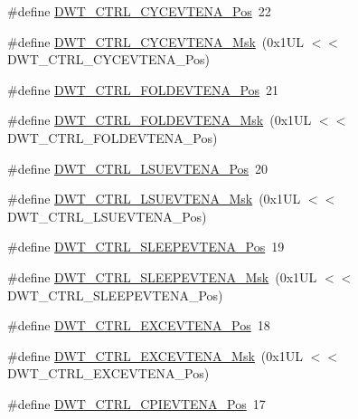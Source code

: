 \begin{DoxyCompactItemize}
\item 
\#define \hyperlink{group__CMSIS__DWT_ga0cb0640aaeb18a626d7823570d5c3cb6}{D\+W\+T\+\_\+\+C\+T\+R\+L\+\_\+\+C\+Y\+C\+E\+V\+T\+E\+N\+A\+\_\+\+Pos}~22
\item 
\#define \hyperlink{group__CMSIS__DWT_ga40554bd81460e39abf08810f45fac1a2}{D\+W\+T\+\_\+\+C\+T\+R\+L\+\_\+\+C\+Y\+C\+E\+V\+T\+E\+N\+A\+\_\+\+Msk}~(0x1\+U\+L $<$$<$ D\+W\+T\+\_\+\+C\+T\+R\+L\+\_\+\+C\+Y\+C\+E\+V\+T\+E\+N\+A\+\_\+\+Pos)
\item 
\#define \hyperlink{group__CMSIS__DWT_ga5602b0707f446ce78d88ff2a3a82bfff}{D\+W\+T\+\_\+\+C\+T\+R\+L\+\_\+\+F\+O\+L\+D\+E\+V\+T\+E\+N\+A\+\_\+\+Pos}~21
\item 
\#define \hyperlink{group__CMSIS__DWT_ga717e679d775562ae09185a3776b1582f}{D\+W\+T\+\_\+\+C\+T\+R\+L\+\_\+\+F\+O\+L\+D\+E\+V\+T\+E\+N\+A\+\_\+\+Msk}~(0x1\+U\+L $<$$<$ D\+W\+T\+\_\+\+C\+T\+R\+L\+\_\+\+F\+O\+L\+D\+E\+V\+T\+E\+N\+A\+\_\+\+Pos)
\item 
\#define \hyperlink{group__CMSIS__DWT_gaea5d1ee72188dc1d57b54c60a9f5233e}{D\+W\+T\+\_\+\+C\+T\+R\+L\+\_\+\+L\+S\+U\+E\+V\+T\+E\+N\+A\+\_\+\+Pos}~20
\item 
\#define \hyperlink{group__CMSIS__DWT_gac47427f455fbc29d4b6f8a479169f2b2}{D\+W\+T\+\_\+\+C\+T\+R\+L\+\_\+\+L\+S\+U\+E\+V\+T\+E\+N\+A\+\_\+\+Msk}~(0x1\+U\+L $<$$<$ D\+W\+T\+\_\+\+C\+T\+R\+L\+\_\+\+L\+S\+U\+E\+V\+T\+E\+N\+A\+\_\+\+Pos)
\item 
\#define \hyperlink{group__CMSIS__DWT_ga9c6d62d121164013a8e3ee372f17f3e5}{D\+W\+T\+\_\+\+C\+T\+R\+L\+\_\+\+S\+L\+E\+E\+P\+E\+V\+T\+E\+N\+A\+\_\+\+Pos}~19
\item 
\#define \hyperlink{group__CMSIS__DWT_ga2f431b3734fb840daf5b361034856da9}{D\+W\+T\+\_\+\+C\+T\+R\+L\+\_\+\+S\+L\+E\+E\+P\+E\+V\+T\+E\+N\+A\+\_\+\+Msk}~(0x1\+U\+L $<$$<$ D\+W\+T\+\_\+\+C\+T\+R\+L\+\_\+\+S\+L\+E\+E\+P\+E\+V\+T\+E\+N\+A\+\_\+\+Pos)
\item 
\#define \hyperlink{group__CMSIS__DWT_gaf4e73f548ae3e945ef8b1d9ff1281544}{D\+W\+T\+\_\+\+C\+T\+R\+L\+\_\+\+E\+X\+C\+E\+V\+T\+E\+N\+A\+\_\+\+Pos}~18
\item 
\#define \hyperlink{group__CMSIS__DWT_gab7ee0def33423b5859ca4030dff63b58}{D\+W\+T\+\_\+\+C\+T\+R\+L\+\_\+\+E\+X\+C\+E\+V\+T\+E\+N\+A\+\_\+\+Msk}~(0x1\+U\+L $<$$<$ D\+W\+T\+\_\+\+C\+T\+R\+L\+\_\+\+E\+X\+C\+E\+V\+T\+E\+N\+A\+\_\+\+Pos)
\item 
\#define \hyperlink{group__CMSIS__DWT_ga9fff0b71fb0be1499f5180c6bce1fc8f}{D\+W\+T\+\_\+\+C\+T\+R\+L\+\_\+\+C\+P\+I\+E\+V\+T\+E\+N\+A\+\_\+\+Pos}~17
$$
\end{DoxyCompactItemize}
